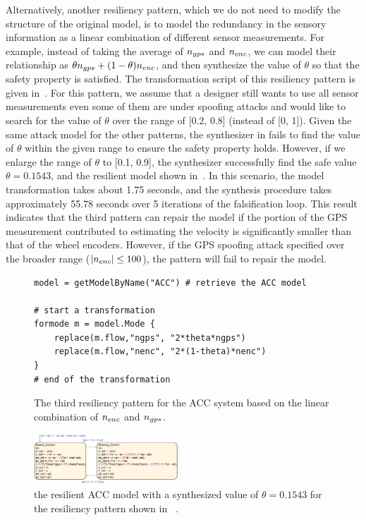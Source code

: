 Alternatively, another resiliency pattern, which we do not need to modify the structure of the original model, is to model the redundancy in the sensory information as a linear combination of different sensor measurements. For example, instead of taking the average of $n_{gps}$ and $n_{enc}$, we can model their relationship as $\theta n_{gps} + (1-\theta)n_{enc}$, and then synthesize the value of $\theta$ so that the safety property is satisfied. The transformation script of this resiliency pattern is given in~. For this pattern, we assume that a designer still wants to use all sensor measurements even some of them are under spoofing attacks and would like to search for the value of $\theta$ over the range of [0.2, 0.8] (instead of [0, 1]). Given the same attack model for the other patterns, the synthesizer in \toolreaffirm fails to find the value of $\theta$ within the given range to ensure the safety property holds. However, if we enlarge the range of $\theta$ to [0.1, 0.9], the synthesizer successfully find the safe value $\theta = 0.1543$, and the resilient model shown in~. In this scenario, the model transformation takes about 1.75 seconds, and the synthesis procedure takes approximately 55.78 seconds over 5 iterations of the falsification loop.    
%
This result indicates that the third pattern can repair the model if the portion of the GPS measurement contributed to estimating the velocity is significantly smaller than that of the wheel encoders. However, if the GPS spoofing attack specified over the broader range (\eg $|n_{enc}| \leq 100$), the pattern will fail to repair the model.          

\begin{figure}[!t]%
\begin{lstlisting}[basicstyle=\ttfamily\footnotesize, numbers=none]
model = getModelByName("ACC") # retrieve the ACC model

# start a transformation  
formode m = model.Mode {
    replace(m.flow,"ngps", "2*theta*ngps")
    replace(m.flow,"nenc", "2*(1-theta)*nenc")
}
# end of the transformation
\end{lstlisting}
\caption{The third resiliency pattern for the ACC system based on the linear combination of $n_{enc}$ and $n_{gps}$.}%
%
\end{figure}


\begin{figure}[t!]%
	\centering%
    \includegraphics[width=0.48\textwidth]{image/acc_model_pat3}%
	\caption{the resilient ACC model with a synthesized value of $\theta = 0.1543$ for the resiliency pattern shown in ~.}%
\end{figure}%






